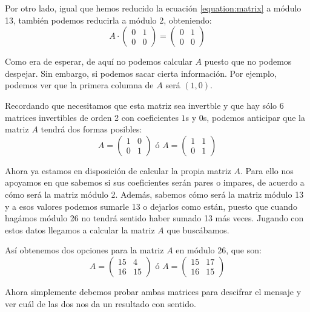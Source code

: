 \begin{example}
Por otro lado, igual que hemos reducido la ecuación \ref{equation:matrix} a módulo 13, también podemos reducirla a módulo 2, obteniendo:
\[A \cdot \left( \begin{array}{cc}
0 & 1 \\
0 & 0  \end{array} \right) = \left( \begin{array}{cc}
0 & 1 \\
0 & 0  \end{array} \right) \]

Como era de esperar, de aquí no podemos calcular $A$ puesto que no podemos despejar. Sin embargo, si podemos sacar cierta información. Por ejemplo, podemos ver que la primera columna de $A$ será $(1,0)$.

Recordando que necesitamos que esta matriz sea invertble y que hay sólo 6 matrices invertibles de orden 2 con coeficientes $1$s y $0$s, podemos anticipar que la matriz $A$ tendrá dos formas posibles:
\[A=\left( \begin{array}{cc}
1 & 0 \\
0 & 1  \end{array} \right) \text{ ó } A= \left( \begin{array}{cc}
1 & 1 \\
0 & 1  \end{array} \right)\]

Ahora ya estamos en disposición de calcular la propia matriz $A$. Para ello nos apoyamos en que sabemos si sus coeficientes serán pares o impares, de acuerdo a cómo será la matriz módulo 2. Además, sabemos cómo será la matriz módulo 13 y a esos valores podemos sumarle 13 o dejarlos como están, puesto que cuando hagámos módulo 26 no tendrá sentido haber sumado 13 más veces. Jugando con estos datos llegamos a calcular la matriz $A$ que buscábamos.

Así obtenemos dos opciones para la matriz $A$ en módulo 26, que son:
\[A=\left( \begin{array}{cc}
15 & 4 \\
16 & 15  \end{array} \right) \text{ ó } A= \left( \begin{array}{cc}
15 & 17 \\
16 & 15  \end{array} \right)\]

Ahora simplemente debemos probar ambas matrices para descifrar el mensaje y ver cuál de las dos nos da un resultado con sentido.
\end{example}


